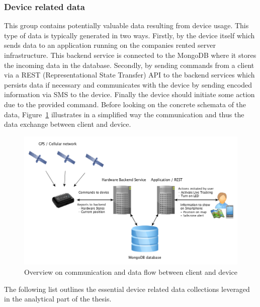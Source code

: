 \subsubsection{Device related data}
\label{sssec:deviceRelatedData}
This group contains potentially valuable data resulting from device usage. This type of data is typically generated in two ways. Firstly, by the device itself which sends data to an application running on the companies rented server infrastructure. This backend service is connected to the MongoDB where it stores the incoming data in the database. Secondly, by sending commands from a client via a REST (Representational State Transfer) API to the backend services which persists data if necessary and communicates with the device by sending encoded information via SMS to the device. Finally the device should initiate some action due to the provided command. Before looking on the concrete schemata of the data, Figure~\ref{fig:tractiveDataFlow} illustrates in a simplified way the communication and thus the data exchange between client and device. 

\begin{figure}
	\centering
		\includegraphics[width=1.0\textwidth]{img/tractiveDataFlow.png}
	\caption{Overview on communication and data flow between client and device}
	\label{fig:tractiveDataFlow}
\end{figure}

The following list outlines the essential device related data collections leveraged in the analytical part of the thesis. 

